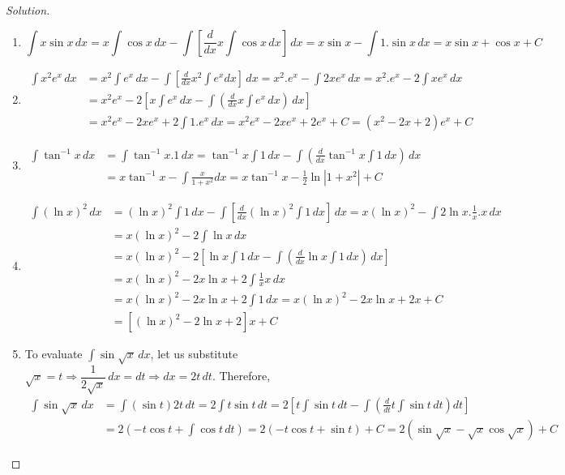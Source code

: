 \documentclass{book}
\theoremstyle{definition}
\newenvironment{solution}
    {\begin{proof}[Solution]}
    {\end{proof}}
\begin{document}
\begin{solution}
\begin{enumerate}[label=(\roman*)]

\item 
\[
\int x\sin x\,dx = x\int \cos x\,dx-\int \left[\frac{d}{dx}x\int \cos x\,dx\right]\,dx = x\sin x-\int 1.\sin x\,dx = x\sin x+\cos x+C
\]

\item 
\begin{align*}
\int x^2 e^x\,dx &= x^2\int e^x\,dx -\int \left[\frac{d}{dx}x^2\int e^xdx\right]\,dx
=x^2.e^x-\int 2xe^x\,dx = x^2.e^x-2\int xe^x\,dx \\
&= x^2e^x-2\left[x\int e^x\,dx-\int\left(\frac{d}{dx}x\int e^x\,dx\right)\,dx\right] \\
&= x^2e^x-2xe^x+2\int 1.e^x\,dx = x^2e^x-2xe^x+2e^x+C =(x^2-2x+2)e^x+C
\end{align*}


\item 
\begin{align*}
\int \tan^{-1}x\,dx &= \int \tan^{-1}x.1\,dx = \tan^{-1}x\int 1\,dx-\int\left(\frac{d}{dx}\tan^{-1}x\int1\,dx\right)\,dx \\
&=x\tan^{-1}x-\int\frac{x}{1+x^2}dx=x\tan^{-1}x-\frac{1}{2}\ln\left|1+x^2\right|+C    
\end{align*}

\item 
\begin{align*}
\int (\ln x)^2\,dx &= (\ln x)^2\int 1\,dx-\int\left[\frac{d}{dx}(\ln x)^2\int 1\,dx\right]\,dx = x(\ln x)^2-\int2\ln x.\frac{1}{x}.x\,dx \\
&= x(\ln x)^2-2\int \ln x\,dx \\
&= x(\ln x)^2-2\left[\ln x\int 1\,dx-\int\left(\frac{d}{dx}\ln x\int1\,dx\right)\,dx\right] \\
&= x(\ln x)^2-2x\ln x+2\int\frac{1}{x}x\,dx \\
&= x(\ln x)^2-2x\ln x+2\int 1\,dx = x(\ln x)^2-2x\ln x+2x+C \\
&= [(\ln x)^2-2\ln x+2]x+C
\end{align*}

\item 
To evaluate $\displaystyle\int \sin \sqrt{x}\,dx$, let us substitute $\sqrt{x}=t \Rightarrow \dfrac{1}{2\sqrt{x}}\,dx=dt\Rightarrow dx=2t\,dt$. Therefore,
\begin{align*}
    \int \sin \sqrt{x}\,dx&=\int (\sin t)2t\,dt=2\int t\sin t\,dt = 2\left[t\int \sin t\,dt-\int\left(\frac{d}{dt}t\int\sin t\,dt\right)dt\right] \\
    &= 2(-t\cos t+\int\cos t\,dt) = 2(-t\cos t+\sin t)+C = 2(\sin\sqrt{x}-\sqrt{x}\cos\sqrt{x})+C
\end{align*}


\end{enumerate}
\end{solution}
\end{document}
